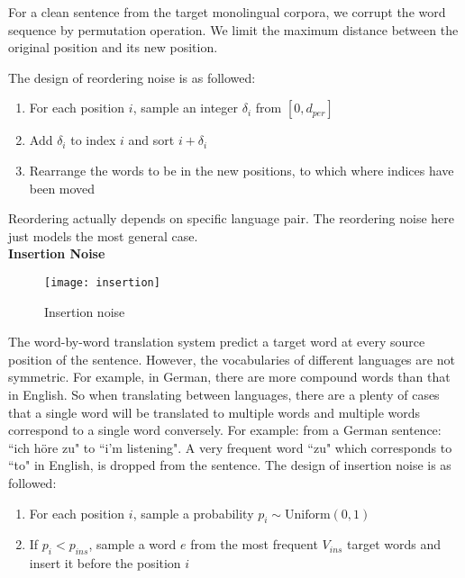 	For a clean sentence from the target monolingual corpora, we corrupt the word sequence by permutation operation. We limit the maximum distance between the original position and its new position.
	
	The design of reordering noise is as followed:
	\begin{enumerate}
		\item For each position ${i}$, sample an integer ${\delta_i}$ from ${[0, d_{per}]}$
		\item Add ${\delta_{i}}$ to index ${i}$ and sort ${i+\delta_{i}}$
		\item Rearrange the words to be in the new positions, to which where indices have been moved
	\end{enumerate}
	
	Reordering actually depends on specific language pair. The reordering noise here just models the most general case.\\

	
	\textbf{Insertion Noise}\\
	\begin{figure}[ht]
	\texttt{[image: insertion]}
	\caption{Insertion noise}
	\centering
\end{figure}	

	The word-by-word translation system predict a target word at every source position of the sentence. However,  the vocabularies of different languages are not symmetric. For example, in German, there are more compound words than that in English. So when translating between languages, there are a plenty of cases that a single word will be translated to multiple words and multiple words correspond to a single word conversely. For example: from a German sentence: ``ich höre zu" to ``i'm listening". A very frequent word ``zu" which corresponds to ``to" in English, is dropped from the sentence. The design of insertion noise is as followed:
	\begin{enumerate}	
		\item For each position ${i}$, sample a probability ${p_i \sim \textrm{Uniform}(0,1)}$
		\item If ${p_i} < p_{ins}$, sample a word ${e}$ from the most frequent ${V_{ins}}$ target words and insert it before the position ${i}$
	\end{enumerate}

